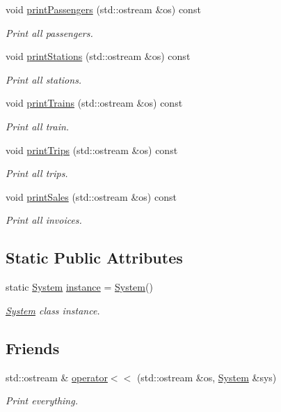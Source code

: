 \begin{DoxyCompactItemize}
void \mbox{\hyperlink{classSystem_a1c5753d5c70d15dc3fe56fd5e421ba76}{print\+Passengers}} (std\+::ostream \&os) const
\begin{DoxyCompactList}\small\item\em Print all passengers. \end{DoxyCompactList}\item 
void \mbox{\hyperlink{classSystem_ac4b65c4fe2628e7d35b1027161e9d1da}{print\+Stations}} (std\+::ostream \&os) const
\begin{DoxyCompactList}\small\item\em Print all stations. \end{DoxyCompactList}\item 
void \mbox{\hyperlink{classSystem_af4610f38d80e01a18f2083a7c5fbd5ce}{print\+Trains}} (std\+::ostream \&os) const
\begin{DoxyCompactList}\small\item\em Print all train. \end{DoxyCompactList}\item 
void \mbox{\hyperlink{classSystem_abaa61b6377abcfc61da32092e5d734d9}{print\+Trips}} (std\+::ostream \&os) const
\begin{DoxyCompactList}\small\item\em Print all trips. \end{DoxyCompactList}\item 
void \mbox{\hyperlink{classSystem_aaad47fd0e1bf746a0bed32feb9553e53}{print\+Sales}} (std\+::ostream \&os) const
\begin{DoxyCompactList}\small\item\em Print all invoices. \end{DoxyCompactList}\end{DoxyCompactItemize}
\subsection*{Static Public Attributes}
\begin{DoxyCompactItemize}
\item 
static \mbox{\hyperlink{classSystem}{System}} \mbox{\hyperlink{classSystem_a40d348884d1b737ecd26b4bc6509bf48}{instance}} = \mbox{\hyperlink{classSystem}{System}}()
\begin{DoxyCompactList}\small\item\em \mbox{\hyperlink{classSystem}{System}} class instance. \end{DoxyCompactList}\end{DoxyCompactItemize}
\subsection*{Friends}
\begin{DoxyCompactItemize}
\item 
std\+::ostream \& \mbox{\hyperlink{classSystem_a1efa95132e95a7a6b11c3b54916d66ae}{operator$<$$<$}} (std\+::ostream \&os, \mbox{\hyperlink{classSystem}{System}} \&sys)
\begin{DoxyCompactList}\small\item\em Print everything. \end{DoxyCompactList}\end{DoxyCompactItemize}


